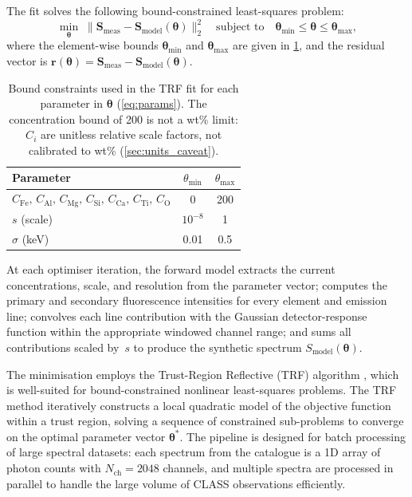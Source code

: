 \documentclass[journal,lettersize]{IEEEtran}
\begin{document}
The fit solves the following bound-constrained least-squares problem:
\begin{equation}\label{eq:objective}
  \min_{\boldsymbol{\theta}}\;
    \bigl\|\mathbf{S}_{\mathrm{meas}}
      - \mathbf{S}_{\mathrm{model}}(\boldsymbol{\theta})\bigr\|_2^2
  \quad\text{subject to}\quad
  \boldsymbol{\theta}_{\min} \leq \boldsymbol{\theta}
    \leq \boldsymbol{\theta}_{\max},
\end{equation}
where the element-wise bounds
$\boldsymbol{\theta}_{\min}$ and $\boldsymbol{\theta}_{\max}$ are given
in \cref{tab:bounds}, and the residual vector is
$\mathbf{r}(\boldsymbol{\theta}) =
  \mathbf{S}_{\mathrm{meas}} -
  \mathbf{S}_{\mathrm{model}}(\boldsymbol{\theta})$.

\begin{table}[!t]
  \centering
  \caption{Bound constraints used in the TRF fit for each parameter in
    $\boldsymbol{\theta}$ (\cref{eq:params}). The concentration bound of
    200 is not a wt\% limit: $C_i$ are unitless relative scale factors,
    not calibrated to wt\% (\cref{sec:units_caveat}).}
  \label{tab:bounds}
  \begin{tabular}{lcc}
    \toprule
    \textbf{Parameter} & $\theta_{\min}$ & $\theta_{\max}$ \\
    \midrule
    $C_{\mathrm{Fe}},\,C_{\mathrm{Al}},\,C_{\mathrm{Mg}},\,C_{\mathrm{Si}},\,C_{\mathrm{Ca}},\,C_{\mathrm{Ti}},\,C_{\mathrm{O}}$ & 0 & 200 \\
    $s$ (scale) & $10^{-8}$ & 1 \\
    $\sigma$ (keV) & 0.01 & 0.5 \\
    \bottomrule
  \end{tabular}
\end{table}

At each optimiser iteration, the forward model extracts the current
concentrations, scale, and resolution from the parameter vector;
computes the primary and secondary fluorescence intensities for every
element and emission line; convolves each line contribution with the
Gaussian detector-response function within the appropriate windowed
channel range; and sums all contributions scaled by~$s$ to produce the
synthetic spectrum $S_{\mathrm{model}}(\boldsymbol{\theta})$.

The minimisation employs the Trust-Region Reflective (TRF) algorithm
\cite{Branch1999}, which is well-suited for bound-constrained nonlinear
least-squares problems.  The TRF method iteratively constructs a local
quadratic model of the objective function within a trust region, solving
a sequence of constrained sub-problems to converge on the optimal
parameter vector $\boldsymbol{\theta}^*$.  The pipeline is designed for
batch processing of large spectral datasets: each spectrum from the
catalogue is a 1D array of photon counts with
$N_{\mathrm{ch}} = 2048$ channels, and multiple spectra are
processed in parallel to handle the large volume of CLASS observations
efficiently.
\end{document}
